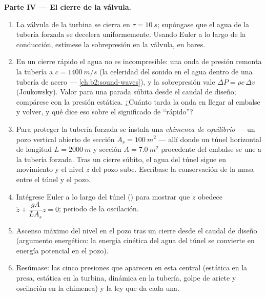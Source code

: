 \begin{problem}
\medskip
\noindent\textbf{Parte IV --- El cierre de la válvula.}
\begin{enumerate}[resume]
  \item La válvula de la turbina se cierra en $\tau = \qty{10}{s}$;
        supóngase que el agua de la tubería forzada se decelera
        uniformemente. Usando Euler a lo largo de la conducción, estímese
        la sobrepresión en la válvula, en bares.
  \item En un cierre rápido el agua no es incompresible: una onda de
        presión remonta la tubería a $c = \qty{1400}{m/s}$ (la celeridad
        del sonido en el agua dentro de una tubería de acero ---
        \cref{ch:b2:sound-waves}), y la sobrepresión vale
        $\Delta P = \rho c\,\Delta v$ (Joukowsky). Valor para una parada
        súbita desde el caudal de diseño; compárese con la presión
        estática. ¿Cuánto tarda la onda en llegar al embalse y volver, y
        qué dice eso sobre el significado de ``rápido''?
  \item Para proteger la tubería forzada se instala una \emph{chimenea de
        equilibrio} --- un pozo vertical abierto de sección
        $A_s = \qty{100}{m^2}$ --- allí donde un túnel horizontal de
        longitud $L = \qty{2000}{m}$ y sección $A =
        \qty{7.0}{m^2}$ procedente del embalse se une a la tubería
        forzada. Tras un cierre súbito, el agua del túnel sigue en
        movimiento y el nivel $z$ del pozo sube. Escríbase la conservación
        de la masa entre el túnel y el pozo.
  \item Intégrese Euler a lo largo del túnel () para
        mostrar que $z$ obedece $\ddot z + \dfrac{gA}{LA_s}z = 0$; periodo
        de la oscilación.
  \item Ascenso máximo del nivel en el pozo tras un cierre desde el caudal
        de diseño (argumento energético: la energía cinética del agua del
        túnel se convierte en energía potencial en el pozo).
  \item Resúmase: las cinco presiones que aparecen en esta central
        (estática en la presa, estática en la turbina, dinámica en la
        tubería, golpe de ariete y oscilación en la chimenea) y la ley que
        da cada una.
\end{enumerate}
\end{problem}
